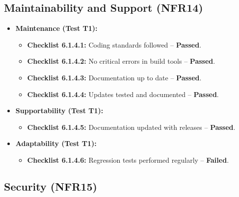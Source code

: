 \documentclass[12pt, titlepage]{article}
\begin{document}
\subsection{Maintainability and Support (NFR14)}  
\label{nfr14}

\begin{itemize}
    \item \textbf{Maintenance (Test T1):}  
    \begin{itemize}
        \item \textbf{Checklist 6.1.4.1:} Coding standards followed – \textbf{Passed}.  
        \item \textbf{Checklist 6.1.4.2:} No critical errors in build tools – \textbf{Passed}.  
        \item \textbf{Checklist 6.1.4.3:} Documentation up to date – \textbf{Passed}.  
        \item \textbf{Checklist 6.1.4.4:} Updates tested and documented – \textbf{Passed}.  
    \end{itemize}
    
    \item \textbf{Supportability (Test T1):}  
    \begin{itemize}
        \item \textbf{Checklist 6.1.4.5:} Documentation updated with releases – \textbf{Passed}.  
    \end{itemize}
    
    \item \textbf{Adaptability (Test T1):}  
    \begin{itemize}
        \item \textbf{Checklist 6.1.4.6:} Regression tests performed regularly – \textbf{Failed}.  
    \end{itemize}
\end{itemize}

\subsection{Security (NFR15)}  
\label{nfr15}
\end{document}
